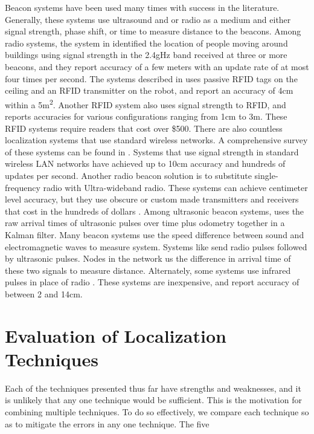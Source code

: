 \documentclass{article}
\begin{document}
Beacon systems have been used many times with success in the literature. Generally, these systems use ultrasound and or radio as a medium and either signal strength, phase shift, or time to measure distance to the beacons. Among radio systems, the system in \cite{bahl_radar:_2000} identified the location of people moving around buildings using signal strength in the 2.4gHz band received at three or more beacons, and they report accuracy of a few meters with an update rate of at most four times per second. The systems described in \cite{digiampaolo_mobile_2014} uses passive RFID tags on the ceiling and an RFID transmitter on the robot, and report an accuracy of 4\si{\centi\meter} within a 5\si{\square\meter}. Another RFID system \cite{saab_standalone_2011} also uses signal strength to RFID, and reports accuracies for various configurations ranging from 1\si{\centi\meter} to 3\si{\meter}. These RFID systems require readers that cost over \$500. There are also countless localization systems that use standard wireless networks. A comprehensive survey of these systems can be found in \cite{liu_survey_2007}. Systems that use signal strength in standard wireless LAN networks have achieved up to 10\si{\centi\meter} accuracy and hundreds of updates per second. Another radio beacon solution is to substitute single-frequency radio with Ultra-wideband radio. These systems can achieve centimeter level accuracy, but they use obscure or custom made transmitters and receivers that cost in the hundreds of dollars \cite{noauthor_dart_nodate} \cite{noauthor_pozyx_nodate}. Among ultrasonic beacon systems, \cite{kleeman_optimal_1992} uses the raw arrival times of ultrasonic pulses over time plus odometry together in a Kalman filter. Many beacon systems use the speed difference between sound and electromagnetic waves to measure system. Systems like \cite{smith_tracking_2004} \cite{ward_new_1997} \cite{kim_advanced_2008} send radio pulses followed by ultrasonic pulses. Nodes in the network us the difference in arrival time of these two signals to measure distance. Alternately, some systems use infrared pulses in place of radio \cite{ghidary_new_1999} \cite{yucel_development_2012}. These systems are inexpensive, and report accuracy of between 2 and 14\si{\centi\meter}.

\section{Evaluation of Localization Techniques} \label{methods}

Each of the techniques presented thus far have strengths and weaknesses, and it is unlikely that any one technique would be sufficient. This is the motivation for combining multiple techniques. To do so effectively, we compare each technique so as to mitigate the errors in any one technique. The five
\end{document}
